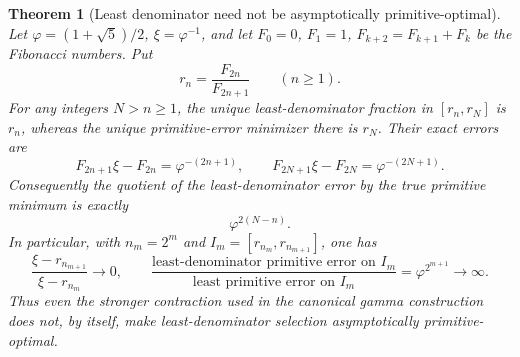 \documentclass[11pt,a4paper]{article}
\newtheorem{theorem}{Theorem}[section]
\theoremstyle{definition}
\theoremstyle{remark}
\begin{document}
\begin{theorem}[Least denominator need not be asymptotically primitive-optimal]
\label{unified-selection-fibonacci-separation}
Let $\varphi=(1+\sqrt5)/2$, $\xi=\varphi^{-1}$, and let
$F_0=0$, $F_1=1$, $F_{k+2}=F_{k+1}+F_k$ be the Fibonacci numbers.
Put
\[
 r_n=\frac{F_{2n}}{F_{2n+1}}\qquad(n\ge1).
\]
For any integers $N>n\ge1$, the unique least-denominator fraction in
$[r_n,r_N]$ is $r_n$, whereas the unique primitive-error minimizer there
is $r_N$. Their exact errors are
\begin{equation}\label{unified-selection-fibonacci-errors}
 F_{2n+1}\xi-F_{2n}=\varphi^{-(2n+1)},\qquad
 F_{2N+1}\xi-F_{2N}=\varphi^{-(2N+1)}.
\end{equation}
Consequently the quotient of the least-denominator error by the true
primitive minimum is exactly
\begin{equation}\label{unified-selection-fibonacci-ratio}
 \varphi^{2(N-n)}.
\end{equation}
In particular, with $n_m=2^m$ and
$I_m=[r_{n_m},r_{n_{m+1}}]$, one has
\[
 \frac{\xi-r_{n_{m+1}}}{\xi-r_{n_m}}\longrightarrow0,
 \qquad
 \frac{\text{least-denominator primitive error on }I_m}
      {\text{least primitive error on }I_m}
 =\varphi^{2^{m+1}}\longrightarrow\infty.
\]
Thus even the stronger contraction used in the canonical gamma
construction does not, by itself, make least-denominator selection
asymptotically primitive-optimal.
\end{theorem}
\end{document}
